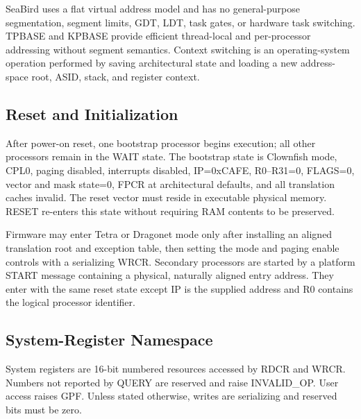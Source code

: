 \documentclass[11pt]{article}
\begin{document}
SeaBird uses a flat virtual address model and has no general-purpose segmentation, segment limits, GDT, LDT, task gates, or hardware task switching. TPBASE and KPBASE provide efficient thread-local and per-processor addressing without segment semantics. Context switching is an operating-system operation performed by saving architectural state and loading a new address-space root, ASID, stack, and register context.

\subsection{Reset and Initialization}

After power-on reset, one bootstrap processor begins execution; all other processors remain in the WAIT state. The bootstrap state is Clownfish mode, CPL0, paging disabled, interrupts disabled, IP=0xCAFE, R0--R31=0, FLAGS=0, vector and mask state=0, FPCR at architectural defaults, and all translation caches invalid. The reset vector must reside in executable physical memory. RESET re-enters this state without requiring RAM contents to be preserved.

Firmware may enter Tetra or Dragonet mode only after installing an aligned translation root and exception table, then setting the mode and paging enable controls with a serializing WRCR. Secondary processors are started by a platform START message containing a physical, naturally aligned entry address. They enter with the same reset state except IP is the supplied address and R0 contains the logical processor identifier.

\subsection{System-Register Namespace}

System registers are 16-bit numbered resources accessed by RDCR and WRCR. Numbers not reported by QUERY are reserved and raise INVALID\_OP. User access raises GPF. Unless stated otherwise, writes are serializing and reserved bits must be zero.
\end{document}
